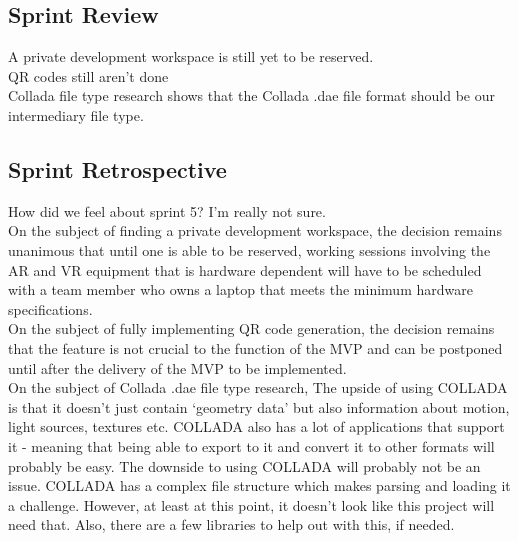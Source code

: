     \subsection{Sprint Review}
    \label{sec:Sprint5_review}
        \hspace{7mm}
        A private development workspace is still yet to be reserved.\\

        QR codes still aren't done\\
        
        Collada file type research shows that the Collada .dae file format should be our intermediary file type.

    \subsection{Sprint Retrospective}
    \label{sec:Sprint5_retrospective}
        \hspace{7mm}
        How did we feel about sprint 5? I'm really not sure.\\
        
        On the subject of finding a private development workspace, the decision remains unanimous that until one 
        is able to be reserved, working sessions involving the AR and VR equipment that is hardware dependent 
        will have to be scheduled with a team member who owns a laptop that meets the minimum hardware
        specifications.\\

        On the subject of fully implementing QR code generation, the decision remains that 
        the feature is not crucial to the function of the MVP and can be postponed until after the delivery
        of the MVP to be implemented.\\

        On the subject of Collada .dae file type research, The upside of using COLLADA is that it doesn't just 
        contain `geometry data' but also information about motion, light sources, textures etc. COLLADA also 
        has a lot of applications that support it - meaning that being able to export to it and convert it to 
        other formats will probably be easy. The downside to using COLLADA will probably not be an issue. 
        COLLADA has a complex file structure which makes parsing and loading it a challenge. However, at least 
        at this point, it doesn't look like this project will need that. Also, there are a few libraries to 
        help out with this, if needed.\\